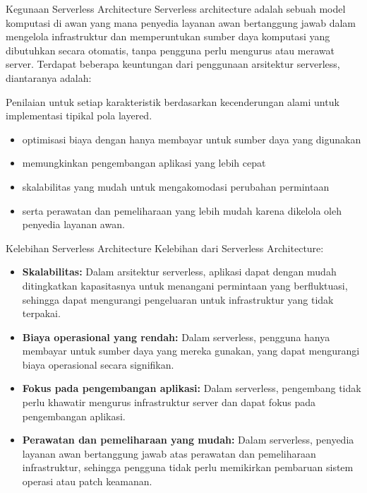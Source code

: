 \documentclass{beamer}
\begin{document}
    \begin{frame}{Kegunaan Serverless Architecture}
        Serverless architecture adalah sebuah model komputasi di awan yang mana penyedia layanan awan bertanggung jawab dalam mengelola infrastruktur dan memperuntukan sumber daya komputasi yang dibutuhkan secara otomatis, tanpa pengguna perlu mengurus atau merawat server. Terdapat beberapa keuntungan dari penggunaan arsitektur serverless, diantaranya adalah:

        Penilaian untuk setiap karakteristik berdasarkan kecenderungan alami untuk implementasi tipikal pola layered.

        \begin{itemize}
            \item optimisasi biaya dengan hanya membayar untuk sumber daya yang digunakan
	        \item memungkinkan pengembangan aplikasi yang lebih cepat
	        \item skalabilitas yang mudah untuk mengakomodasi perubahan permintaan
	        \item serta perawatan dan pemeliharaan yang lebih mudah karena dikelola oleh penyedia layanan awan.
        \end{itemize}
    \end{frame}

    \begin{frame}{Kelebihan Serverless Architecture}
        Kelebihan dari Serverless Architecture:
        \begin{itemize}
            \item \textbf{Skalabilitas:} Dalam arsitektur serverless, aplikasi dapat dengan mudah ditingkatkan kapasitasnya untuk menangani permintaan yang berfluktuasi, sehingga dapat mengurangi pengeluaran untuk infrastruktur yang tidak terpakai.
	        \item \textbf{Biaya operasional yang rendah:} Dalam serverless, pengguna hanya membayar untuk sumber daya yang mereka gunakan, yang dapat mengurangi biaya operasional secara signifikan.
	        \item \textbf{Fokus pada pengembangan aplikasi:} Dalam serverless, pengembang tidak perlu khawatir mengurus infrastruktur server dan dapat fokus pada pengembangan aplikasi.
	        \item \textbf{Perawatan dan pemeliharaan yang mudah:} Dalam serverless, penyedia layanan awan bertanggung jawab atas perawatan dan pemeliharaan infrastruktur, sehingga pengguna tidak perlu memikirkan pembaruan sistem operasi atau patch keamanan.
        \end{itemize}
    \end{frame}
\end{document}
